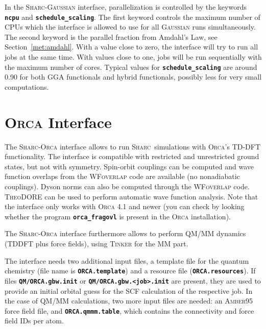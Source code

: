 \documentclass[a4paper,10pt,DIV=15,openany]{scrbook}
\newcommand{\sharc}{\textsc{Sharc}}
\newcommand{\ttt}[1]{\textbf{\texttt{#1}}}
\begin{document}
In the \sharc-\textsc{Gaussian} interface, parallelization is controlled by the keywords \ttt{ncpu} and \ttt{schedule\_scaling}.
The first keyword controls the maximum number of CPUs which the interface is allowed to use for all \textsc{Gaussian} runs simultaneously.
The second keyword is the parallel fraction from Amdahl's Law, see Section~\ref{met:amdahl}.
With a value close to zero, the interface will try to run all jobs at the same time. With values close to one, jobs will be run sequentially with the maximum number of cores.
Typical values for \ttt{schedule\_scaling} are around 0.90 for both GGA functionals and hybrid functionals,  possibly less for very small computations.










\section{\textsc{Orca} Interface}\label{sec:int:orca}

The \sharc-\textsc{Orca} interface allows to run \sharc\ simulations with \textsc{Orca}'s TD-DFT functionality.
The interface is compatible with restricted and unrestricted ground states, but not with symmetry.
Spin-orbit couplings can be computed and wave function overlaps from the \textsc{WFoverlap} code are available (no nonadiabatic couplings).
Dyson norms can also be computed through the \textsc{WFoverlap} code.
\textsc{TheoDORE} can be used to perform automatic wave function analysis.
Note that the interface only works with \textsc{Orca} 4.1 and newer (you can check by looking whether the program \ttt{orca\_fragovl} is present in the \textsc{Orca} installation).

The \sharc-\textsc{Orca} interface furthermore allows to perform QM/MM dynamics (TDDFT plus force fields), using \textsc{Tinker} for the MM part.

The interface needs two additional input files, a template file for the quantum chemistry (file name is \ttt{ORCA.template}) and a resource file (\ttt{ORCA.resources}). 
If files \ttt{QM/ORCA.gbw.init} or \ttt{QM/ORCA.gbw.<job>.init} are present, they are used to provide an initial orbital guess for the SCF calculation of the respective job.
In the case of QM/MM calculations, two more input files are needed: an \textsc{Amber}95 force field file, and \ttt{ORCA.qmmm.table}, which contains the connectivity and force field IDs per atom.
\end{document}
